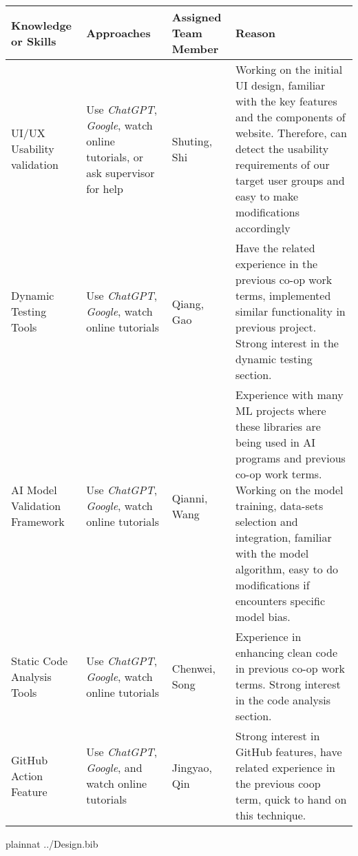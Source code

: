 \documentclass[12pt, titlepage]{article}
\begin{document}
\begin{enumerate}
  \begin{table}[]
    \begin{tabular}{| p{3cm} | p{3.5cm} | p{2cm} | p{5cm} |}
    \hline
      \textbf{Knowledge or Skills} & \textbf{Approaches} & \textbf{Assigned Team Member} & \textbf{Reason} \\
    \hline
      \raggedright UI/UX Usability validation & \raggedright Use \textit{ChatGPT}, \textit{Google}, watch online tutorials, or ask supervisor for help  & Shuting, Shi & Working on the initial UI design, familiar with the key features and the components of website. Therefore, can detect the usability requirements of our target user groups and easy to make modifications accordingly \\
    \hline
      \raggedright  Dynamic Testing Tools & \raggedright Use \textit{ChatGPT}, \textit{Google}, watch online tutorials & Qiang, Gao & Have the related experience in the previous co-op work terms, implemented similar functionality in previous project. Strong interest in the dynamic testing section. \\
    \hline
      \raggedright AI Model Validation Framework & \raggedright Use \textit{ChatGPT}, \textit{Google}, watch online tutorials & Qianni, Wang & Experience with many ML projects where these libraries are being used in AI programs and previous co-op work terms. Working on the model training,  data-sets selection and integration, familiar with the model algorithm, easy to do modifications if encounters specific model bias. \\
    \hline
      \raggedright Static Code Analysis Tools & \raggedright Use \textit{ChatGPT}, \textit{Google}, watch online tutorials & Chenwei, Song & Experience in enhancing clean code in previous co-op work terms. Strong interest in the code analysis section. \\
    \hline
      \raggedright GitHub Action Feature & \raggedright Use \textit{ChatGPT}, \textit{Google}, and watch online tutorials & Jingyao, Qin & Strong interest in GitHub features, have related experience in the previous coop term, quick to hand on this technique. \\
    \hline
    \end{tabular}
\end{table}
\end{enumerate}

\newpage
 {plainnat}
 {../Design.bib}
\end{document}
